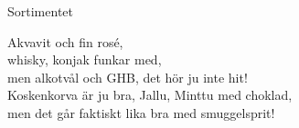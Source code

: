 \begin{song}{Sortimentet}
	
	Akvavit och fin rosé,\\
	whisky, konjak funkar med,\\ 
	men alkotvål och GHB, det hör ju inte hit!\\
	Koskenkorva är ju bra, Jallu, Minttu med choklad,\\
	men det går faktiskt lika bra med smuggelsprit!

	
\end{song}
